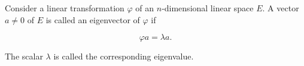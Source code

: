 Consider a linear transformation $\varphi$ of an $n$-dimensional linear space $E$. A vector $a \neq 0$ of $E$ is called an eigenvector of $\varphi$ if

$$\varphi a = \lambda a.$$

The scalar $\lambda$ is called the corresponding eigenvalue.
